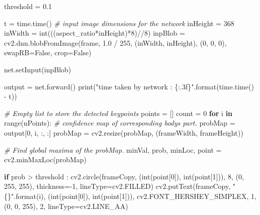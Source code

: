 \documentclass[
  12pt,
  a4paper,
]{article}
\newenvironment{Shaded}{}{}
\newcommand{\BuiltInTok}[1]{#1}
\newcommand{\CommentTok}[1]{\textcolor[rgb]{0.38,0.63,0.69}{\textit{#1}}}
\newcommand{\ControlFlowTok}[1]{\textcolor[rgb]{0.00,0.44,0.13}{\textbf{#1}}}
\newcommand{\DecValTok}[1]{\textcolor[rgb]{0.25,0.63,0.44}{#1}}
\newcommand{\FloatTok}[1]{\textcolor[rgb]{0.25,0.63,0.44}{#1}}
\newcommand{\KeywordTok}[1]{\textcolor[rgb]{0.00,0.44,0.13}{\textbf{#1}}}
\newcommand{\NormalTok}[1]{#1}
\newcommand{\OperatorTok}[1]{\textcolor[rgb]{0.40,0.40,0.40}{#1}}
\newcommand{\SpecialCharTok}[1]{\textcolor[rgb]{0.25,0.44,0.63}{#1}}
\newcommand{\StringTok}[1]{\textcolor[rgb]{0.25,0.44,0.63}{#1}}
\newcommand{\VariableTok}[1]{\textcolor[rgb]{0.10,0.09,0.49}{#1}}
\begin{document}
\begin{Shaded}
\begin{Highlighting}[numbers=left,,]
\NormalTok{threshold }\OperatorTok{=} \FloatTok{0.1}

\NormalTok{t }\OperatorTok{=}\NormalTok{ time.time()}
\CommentTok{\# input image dimensions for the network}
\NormalTok{inHeight }\OperatorTok{=} \DecValTok{368}
\NormalTok{inWidth }\OperatorTok{=} \BuiltInTok{int}\NormalTok{(((aspect\_ratio}\OperatorTok{*}\NormalTok{inHeight)}\OperatorTok{*}\DecValTok{8}\NormalTok{)}\OperatorTok{//}\DecValTok{8}\NormalTok{)}
\NormalTok{inpBlob }\OperatorTok{=}\NormalTok{ cv2.dnn.blobFromImage(frame, }\FloatTok{1.0} \OperatorTok{/} \DecValTok{255}\NormalTok{, (inWidth, inHeight), (}\DecValTok{0}\NormalTok{, }\DecValTok{0}\NormalTok{, }\DecValTok{0}\NormalTok{), swapRB}\OperatorTok{=}\VariableTok{False}\NormalTok{, crop}\OperatorTok{=}\VariableTok{False}\NormalTok{)}

\NormalTok{net.setInput(inpBlob)}

\NormalTok{output }\OperatorTok{=}\NormalTok{ net.forward()}
\BuiltInTok{print}\NormalTok{(}\StringTok{"time taken by network : }\SpecialCharTok{\{:.3f\}}\StringTok{"}\NormalTok{.}\BuiltInTok{format}\NormalTok{(time.time() }\OperatorTok{{-}}\NormalTok{ t))}

\CommentTok{\# Empty list to store the detected keypoints}
\NormalTok{points }\OperatorTok{=}\NormalTok{ []}
\NormalTok{count }\OperatorTok{=} \DecValTok{0}
\ControlFlowTok{for}\NormalTok{ i }\KeywordTok{in} \BuiltInTok{range}\NormalTok{(nPoints):}
    \CommentTok{\# confidence map of corresponding body\textquotesingle{}s part.}
\NormalTok{    probMap }\OperatorTok{=}\NormalTok{ output[}\DecValTok{0}\NormalTok{, i, :, :]}
\NormalTok{    probMap }\OperatorTok{=}\NormalTok{ cv2.resize(probMap, (frameWidth, frameHeight))}

    \CommentTok{\# Find global maxima of the probMap.}
\NormalTok{    minVal, prob, minLoc, point }\OperatorTok{=}\NormalTok{ cv2.minMaxLoc(probMap)}

    \ControlFlowTok{if}\NormalTok{ prob }\OperatorTok{\textgreater{}}\NormalTok{ threshold :}
\NormalTok{        cv2.circle(frameCopy, (}\BuiltInTok{int}\NormalTok{(point[}\DecValTok{0}\NormalTok{]), }\BuiltInTok{int}\NormalTok{(point[}\DecValTok{1}\NormalTok{])), }\DecValTok{8}\NormalTok{, (}\DecValTok{0}\NormalTok{, }\DecValTok{255}\NormalTok{, }\DecValTok{255}\NormalTok{), thickness}\OperatorTok{={-}}\DecValTok{1}\NormalTok{, lineType}\OperatorTok{=}\NormalTok{cv2.FILLED)}
\NormalTok{        cv2.putText(frameCopy, }\StringTok{"}\SpecialCharTok{\{\}}\StringTok{"}\NormalTok{.}\BuiltInTok{format}\NormalTok{(i), (}\BuiltInTok{int}\NormalTok{(point[}\DecValTok{0}\NormalTok{]), }\BuiltInTok{int}\NormalTok{(point[}\DecValTok{1}\NormalTok{])), cv2.FONT\_HERSHEY\_SIMPLEX, }\DecValTok{1}\NormalTok{, (}\DecValTok{0}\NormalTok{, }\DecValTok{0}\NormalTok{, }\DecValTok{255}\NormalTok{), }\DecValTok{2}\NormalTok{, lineType}\OperatorTok{=}\NormalTok{cv2.LINE\_AA)}


\end{Highlighting}
\end{Shaded}
\end{document}
